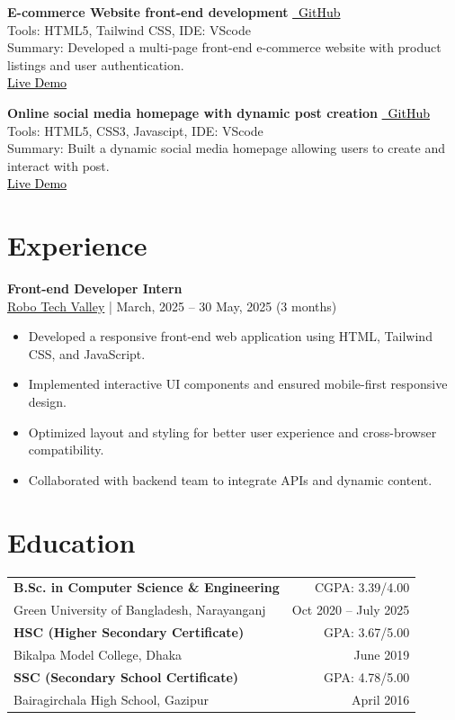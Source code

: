 \documentclass[a4paper,10pt]{article}
\newcommand{\githubbutton}[2]{%
  \colorbox{gray!20}{\href{#1}{\textcolor{black}{\faGithub\ #2}}}%
}
\newcommand{\cvsection}[2]{%
  \section*{\textcolor{blue!50!black}{#1}}\label{#2}%
  \vspace{4pt}%
}
\begin{document}
\vspace{4pt}
\textbf{E-commerce Website front-end development} 
\githubbutton{https://github.com/Nuzmolkhan/Online-Shopping-website-front-end-designing-using-html-tailwindcss}{GitHub} \\
Tools: HTML5, Tailwind CSS, IDE: VScode \\
Summary: Developed a multi-page front-end e-commerce website with product listings and user authentication. \\[2pt]
\colorbox{gray!20}{\href{https://nuzmolkhan.github.io/Online-Shopping-website-front-end-designing-using-html-tailwindcss/index.html}{\textcolor{black}{Live Demo}}}

\vspace{4pt}
\textbf{Online social media homepage with dynamic post creation} 
\githubbutton{https://github.com/Nuzmolkhan/Facebook-home-web-page-with-dynamic-post-creation}{GitHub} \\
Tools: HTML5, CSS3, Javascipt, IDE: VScode \\
Summary: Built a dynamic social media homepage allowing users to create and interact with post. \\[2pt]
\colorbox{gray!20}{\href{https://nuzmolkhan.github.io/Facebook-home-web-page-with-dynamic-post-creation/}{\textcolor{black}{Live Demo}}}

\cvsection{Experience}{sec:experience}

\textbf{Front-end Developer Intern} \\
\colorbox{gray!20}{\href{https://robotechvalley.com/}{Robo Tech Valley}} \; |  March, 2025 -- 30 May, 2025 (3 months) \\
\begin{itemize}
  \item Developed a responsive front-end web application using HTML, Tailwind CSS, and JavaScript.
  \item Implemented interactive UI components and ensured mobile-first responsive design.
  \item Optimized layout and styling for better user experience and cross-browser compatibility.
  \item Collaborated with backend team to integrate APIs and dynamic content.
\end{itemize}

\cvsection{Education}{sec:education}

\begin{tabular}{p{12cm} r}
\textbf{B.Sc. in Computer Science \& Engineering} & CGPA: 3.39/4.00 \\
Green University of Bangladesh, Narayanganj & Oct 2020 -- July 2025 \\[2mm]
\textbf{HSC (Higher Secondary Certificate)} & GPA: 3.67/5.00 \\
Bikalpa Model College, Dhaka & June 2019 \\[2mm]
\textbf{SSC (Secondary School Certificate)} & GPA: 4.78/5.00 \\
Bairagirchala High School, Gazipur & April 2016 \\
\end{tabular}
\end{document}
